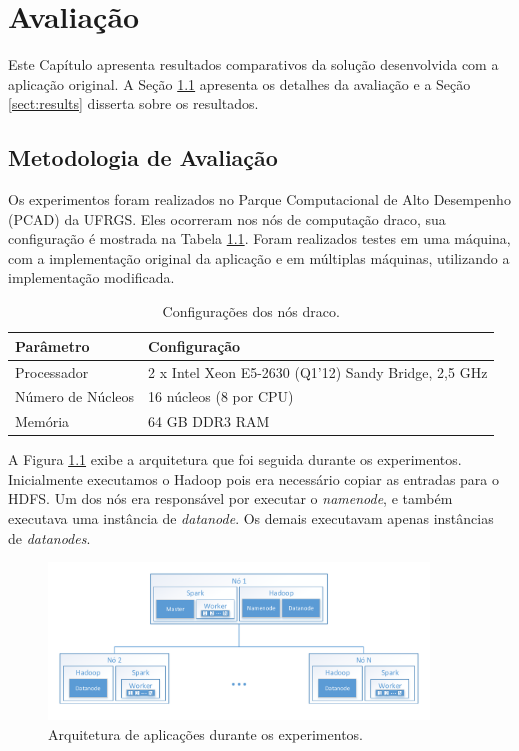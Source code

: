 \chapter{Avaliação} \label{ch:evaluation}

Este Capítulo apresenta resultados comparativos da solução desenvolvida com a 
aplicação original. A Seção \ref{sect:methodology} apresenta os detalhes da 
avaliação e a Seção \ref{sect:results} disserta sobre os resultados.


\section{Metodologia de Avaliação} \label{sect:methodology}

Os experimentos foram realizados no Parque Computacional de Alto 
Desempenho (PCAD) da UFRGS. Eles ocorreram nos nós de computação draco, sua 
configuração é mostrada na Tabela \ref{tab:draco_config}. Foram realizados 
testes em uma máquina, com a implementação original da aplicação e em múltiplas 
máquinas, utilizando a implementação modificada.

\begin{table}[H]
\centering
\begin{tabular}{l l} \toprule
\textbf{Parâmetro}  &  \textbf{Configuração} \\ 
\midrule
Processador     & 2 x Intel Xeon E5-2630 (Q1'12) Sandy Bridge, 2,5 GHz  
\\
Número de Núcleos    & 16 núcleos (8 por CPU)  \\
Memória       & 64 GB DDR3 RAM   \\
\end{tabular}
\caption{Configurações dos nós draco.}
\label{tab:draco_config}
\end{table}


A Figura \ref{fig:experiment_arch} exibe a arquitetura que foi seguida durante 
os experimentos. Inicialmente executamos o Hadoop pois era necessário 
copiar as entradas para o HDFS. Um dos nós era responsável por executar o 
\emph{namenode}, e também executava uma instância de \emph{datanode}. Os demais 
executavam apenas instâncias de \emph{datanodes}.


\begin{figure}[ht]
\centerline{
\includegraphics[width=0.9\textwidth]{./img/experiments_arch.pdf}}
 \caption{Arquitetura de aplicações durante os experimentos.}
 \label{fig:experiment_arch}
\end{figure}


